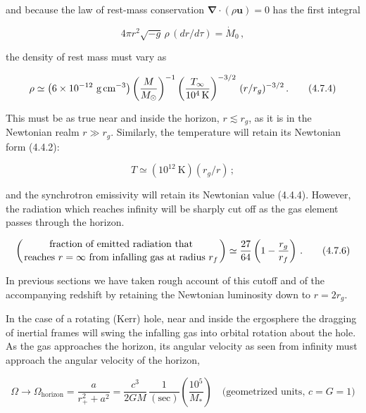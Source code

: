 \documentclass[aps,prd,twocolumn,superscriptaddress,nofootinbib]{revtex4-2}
\newcommand{\fvec}[1]{\mathbf{#1}}
\begin{document}
and because the law of rest-mass conservation $\boldsymbol{\nabla}\cdot(\rho \fvec{u}) = 0$ has the first integral

\begin{equation}
4\pi r^2 \sqrt{-g}\, \rho\,(dr/d\tau) = \dot{M}_0\,,
\tag{4.7.3}
\end{equation}

the density of rest mass must vary as

\begin{equation}
\rho \simeq \left(6 \times 10^{-12}~\text{g\,cm}^{-3}\right)
\left(\frac{M}{M_\odot}\right)^{-1}
\left(\frac{T_\infty}{10^4\,\text{K}}\right)^{-3/2}
\,(r/r_g)^{-3/2}\,.
\tag{4.7.4}
\end{equation}

This must be as true near and inside the horizon, $r \lesssim r_g$, as it is in the Newtonian
realm $r \gg r_g$.  Similarly, the temperature will retain its Newtonian form (4.4.2):

\begin{equation}
T \simeq (10^{12}~\text{K})(r_g/r)\,;
\tag{4.7.5}
\end{equation}

and the synchrotron emissivity will retain its Newtonian value (4.4.4).  However,
the radiation which reaches infinity will be sharply cut off as the gas element
passes through the horizon.

\begin{equation}
\left(\text{fraction of emitted radiation that}\atop
\text{reaches } r = \infty \text{ from infalling gas at radius } r_f\right)
\simeq \frac{27}{64}\left(1 - \frac{r_g}{r_f}\right)\,.
\tag{4.7.6}
\end{equation}

In previous sections we have taken rough account of this cutoff and of the
accompanying redshift by retaining the Newtonian luminosity down to $r = 2r_g$.

In the case of a rotating (Kerr) hole, near and inside the ergosphere the
dragging of inertial frames will swing the infalling gas into orbital rotation
about the hole.  As the gas approaches the horizon, its angular velocity as seen
from infinity must approach the angular velocity of the horizon,

\begin{equation}
\Omega \to \Omega_{\text{horizon}} = \frac{a}{r_+^2 + a^2}
= \frac{c^3}{2GM}\,\frac{1}{(\text{sec})}\left(\frac{10^5}{M_*}\right)
\quad\text{(geometrized units, } c = G = 1\text{)}
\tag{4.7.7}
\end{equation}
\end{document}
